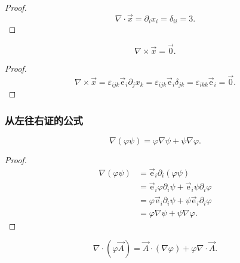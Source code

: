 \begin{proof}
\begin{equation}
\nabla\cdot\vec{x}
=\partial_i x_i
=\delta_{ii}
=3.
\end{equation}
\end{proof}

\begin{example}
\begin{equation}
\nabla\times\vec{x}
=\vec{0}.
\end{equation}
\end{example}

\begin{proof}
\begin{equation}
\nabla\times\vec{x}
=\varepsilon_{ijk}\vec{\mathrm{e}}_i\partial_j x_k
=\varepsilon_{ijk}\vec{\mathrm{e}}_i \delta_{jk}
=\varepsilon_{ikk}\vec{\mathrm{e}}_i
=\vec{0}.
\end{equation}
\end{proof}



\subsubsection{从左往右证的公式}

\begin{example}
\begin{equation}
\nabla(\varphi\psi)
=\varphi\nabla\psi+\psi\nabla\varphi.
\end{equation}
\end{example}

\begin{proof}
\begin{equation}
\begin{split}
\nabla(\varphi\psi)
&=\vec{\mathrm{e}}_i\partial_i(\varphi\psi) \\
&=\vec{\mathrm{e}}_i\varphi\partial_i\psi + \vec{\mathrm{e}}_i\psi\partial_i\varphi \\
&=\varphi\vec{\mathrm{e}}_i\partial_i\psi + \psi\vec{\mathrm{e}}_i\partial_i\varphi \\
&=\varphi\nabla\psi + \psi\nabla\varphi.
\end{split}
\end{equation}
\end{proof}

\begin{example}
\begin{equation}
\nabla\cdot\left(\varphi\vec{A}\right)
=\vec{A}\cdot(\nabla\varphi) + \varphi\nabla\cdot\vec{A}.
\end{equation}
\end{example}

